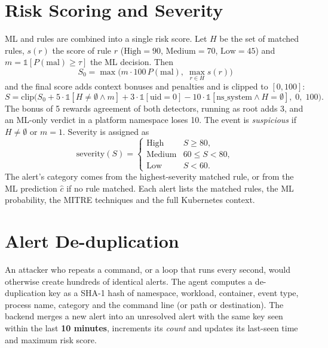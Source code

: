 \section{Risk Scoring and Severity}

ML and rules are combined into a single risk score. Let $H$ be the set of matched
rules, $s(r)$ the score of rule $r$ ($\mathrm{High}=90$, $\mathrm{Medium}=70$,
$\mathrm{Low}=45$) and $m = \mathbb{1}[P(\mathrm{mal}) \geq \tau]$ the ML decision. Then
\begin{equation}
S_0 = \max\Big( m \cdot 100\,P(\mathrm{mal}),\; \max_{r \in H} s(r) \Big)
\end{equation}
and the final score adds context bonuses and penalties and is clipped to $[0, 100]$:
\begin{equation}
S = \mathrm{clip}\big(S_0 + 5\cdot\mathbb{1}[H \neq \emptyset \wedge m]
      + 3\cdot\mathbb{1}[\mathrm{uid}=0] - 10\cdot\mathbb{1}[\mathrm{ns\_system} \wedge H = \emptyset],\; 0,\; 100\big).
\end{equation}
The bonus of 5 rewards agreement of both detectors, running as root adds 3, and an
ML-only verdict in a platform namespace loses 10. The event is \emph{suspicious} if
$H \neq \emptyset$ or $m = 1$. Severity is assigned as
\begin{equation}
\mathrm{severity}(S) =
\begin{cases}
\mathrm{High}   & S \geq 80,\\
\mathrm{Medium} & 60 \leq S < 80,\\
\mathrm{Low}    & S < 60.
\end{cases}
\end{equation}
The alert's category comes from the highest-severity matched rule, or from the ML
prediction $\hat{c}$ if no rule matched. Each alert lists the matched rules, the ML
probability, the MITRE techniques and the full Kubernetes context.

\section{Alert De-duplication}

An attacker who repeats a command, or a loop that runs every second, would otherwise
create hundreds of identical alerts. The agent computes a de-duplication key as a SHA-1
hash of namespace, workload, container, event type, process name, category and the
command line (or path or destination). The backend merges a new alert into an
unresolved alert with the same key seen within the last \textbf{10 minutes}, increments its
\emph{count} and updates its last-seen time and maximum risk score.
